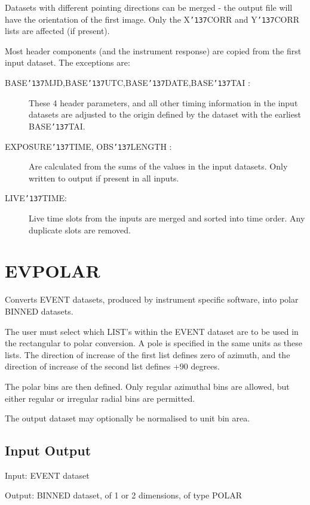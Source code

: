 \documentclass{book}
\renewcommand{\_}{{\tt\char'137}}     %
\begin{document}
Datasets with different pointing directions can be merged - the
output file will have the orientation of the first image. Only the
X\_CORR and Y\_CORR lists are affected (if present).
 
Most header components (and the instrument response) are copied
from the first input dataset. The exceptions are:
 
 
\begin{description}
\item[BASE\_MJD,BASE\_UTC,BASE\_DATE,BASE\_TAI :]
These 4 header parameters, and all other timing information in
the input datasets are adjusted to the origin defined by the
dataset with the earliest BASE\_TAI.
\item[EXPOSURE\_TIME, OBS\_LENGTH :]
Are calculated from the sums of the values in the input datasets.
Only written to output if present in all inputs.
\item[LIVE\_TIME:]
Live time slots from the inputs are merged and sorted into time
order. Any duplicate slots are removed.
\end{description}
\section{EVPOLAR}
Converts EVENT datasets, produced by instrument specific software,
into polar BINNED datasets.
 
The user must select which LIST's within the EVENT dataset are to
be used in the rectangular to polar conversion. A pole is specified
in the same units as these lists. The direction of increase of the
first list defines zero of azimuth, and the direction of increase of
the second list defines +90 degrees.
 
The polar bins are then defined. Only regular azimuthal bins are
allowed, but either regular or irregular radial bins are permitted.
 
The output dataset may optionally be normalised to unit bin area.
 
\subsection{Input Output}
Input: EVENT dataset
 
Output: BINNED dataset, of 1 or 2 dimensions, of type POLAR
 
\end{document}

